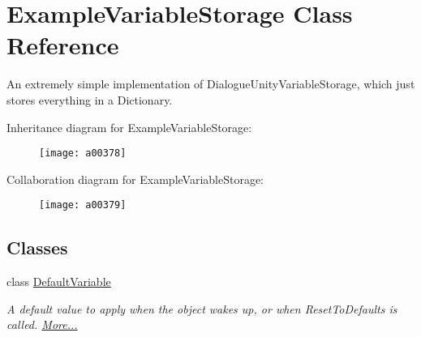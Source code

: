 \hypertarget{a00079}{\section{Example\-Variable\-Storage Class Reference}
\label{a00079}
}


An extremely simple implementation of Dialogue\-Unity\-Variable\-Storage, which just stores everything in a Dictionary.  




Inheritance diagram for Example\-Variable\-Storage\-:
\nopagebreak
\begin{figure}[H]
\begin{center}
\leavevmode
\texttt{[image: a00378]}
\end{center}
\end{figure}


Collaboration diagram for Example\-Variable\-Storage\-:
\nopagebreak
\begin{figure}[H]
\begin{center}
\leavevmode
\texttt{[image: a00379]}
\end{center}
\end{figure}
\subsection*{Classes}
\begin{DoxyCompactItemize}
\item 
class \hyperlink{a00079_a00358}{Default\-Variable}
\begin{DoxyCompactList}\small\item\em A default value to apply when the object wakes up, or when Reset\-To\-Defaults is called.  \hyperlink{a00079_a00358}{More...}\end{DoxyCompactList}\end{DoxyCompactItemize}
